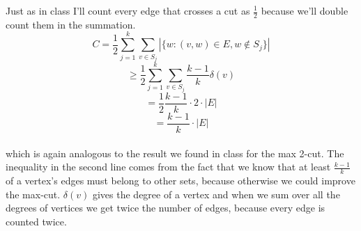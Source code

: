 \documentclass{article}
\begin{document}
\begin{enumerate}
	Just as in class I'll count every edge that crosses a cut as $\frac{1}{2}$ because we'll double count them in the summation.\\
	$$C = \frac{1}{2}\sum_{j=1}^{k}\sum_{v\in S_j}|\{w: (v,w)\in E, w \not\in S_j\}|$$
	$$  \geq \frac{1}{2}\sum_{j=1}^{k}\sum_{v\in S_j}\frac{k-1}{k}\delta(v)$$
	$$ = \frac{1}{2}\frac{k-1}{k}\cdot 2 \cdot |E|$$
	$$ = \frac{k-1}{k}\cdot |E|$$ \\
	which is again analogous to the result we found in class for the max 2-cut.  The inequality in the second line comes from the fact that we know that at least $\frac{k-1}{k}$ of a vertex's edges must belong to other sets, because otherwise we could improve the max-cut.  $\delta(v)$ gives the degree of a vertex and when we sum over all the degrees of vertices we get twice the number of edges, because every edge is counted twice.  
	

\end{enumerate}
\end{document}
